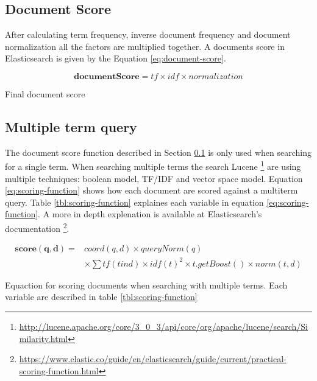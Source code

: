 \subsection{Document Score}
\label{sec:doc-score}
After calculating term frequency, inverse document frequency and document normalization all the factors are multiplied together.
A documents score in Elasticsearch is given by the Equation \ref{eq:document-score}.

\begin{cequation}[H]
	\begin{equation}
		\mathbf{documentScore} = tf \times idf \times normalization
	\end{equation}
	\caption{Final document score}
  \label{eq:document-score}
\end{cequation}

\subsection{Multiple term query}
The document score function described in Section \ref{sec:doc-score} is only used when searching for a single term.
When searching multiple terms the search Lucene \footnote{\url{http://lucene.apache.org/core/3_0_3/api/core/org/apache/lucene/search/Similarity.html}}
are using multiple techniques: boolean model, TF/IDF and vector space model.
Equation \ref{eq:scoring-function} shows how each document are scored against a multiterm query.
Table \ref{tbl:scoring-function} explaines each variable in equation \ref{eq:scoring-function}.
A more in depth explenation is available at Elasticsearch's documentation \footnote{\url{https://www.elastic.co/guide/en/elasticsearch/guide/current/practical-scoring-function.html}}.

\begin{cequation}
	\begin{equation}
		\begin{aligned}
			\mathbf{score(q,d)} = & coord(q,d) \times queryNorm(q) \\
														& \times \sum tf(t in d) \times idf(t)^2 \times t.getBoost() \times norm(t,d)
		\end{aligned}
	\end{equation}
	\caption{Equaction for scoring documents when searching with multiple terms. Each variable are described in table \ref{tbl:scoring-function}}
  \label{eq:scoring-function}
\end{cequation}

